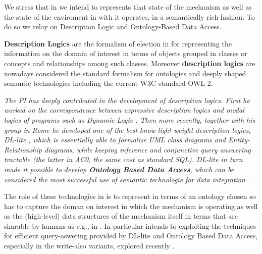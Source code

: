 


We stress that in \project we intend to represents that state of the mechanism as well as the state of the enviroment in with it operates, in a semantically rich fashion. To do so we relay on Description Logic and Ontology-Based Data Access.

\textbf{Description Logics} are the formalism of election in for
representing the information on the domain of interest in terms of
objects grouped in classes or concepts and relationships among such
classes.  Moreover \textbf{description logics} are nowadays considered
the standard formalism for ontologies and deeply shaped semantic
technologies including the current W3C standard OWL 2.

\emph{The PI has deeply contributed in the development of description
logics. First he worked on the correspondence between expressive
description logics and modal logics of programs such as Dynamic Logic \cite{DeGiacomoL96,CalvaneseGL98}.
Then more recently, together with his group in Rome he developed one
of the best know light weight description logics, DL-lite \cite{CalvaneseGLLR07}, which is essentially
able to formalize UML class diagrams and Entity-Relationship diagrams,
while keeping inference and conjunctive query answering tractable (the
latter in AC0, the same cost as standard SQL). DL-lite in turn made it possible to develop \textbf{Ontology Based Data Access}, which can be considered the most successful use of semantic technologie for data integration \cite{PoggiLCGLR08,SequedaM17,Statoil17}. }

The role of these technologies in \project is to represent in terms of an ontology chosen so has to capture the doman on interest in which the mechanism is operating as well as the (high-level) data structures of the mechanism itself in terms that are sharable by humans as e.g., in \cite{TenorthB17}. In particular \project intends to exploiting the techniques for efficient query-aswering provided by DL-lite and Ontology Based Data Access, especially in the write-also variants, explored recently \cite{DORS16,DLOST17}.


